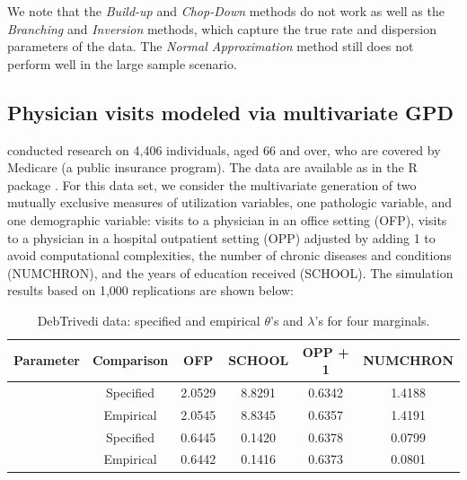 We note that the \textit{Build-up} and \textit{Chop-Down} methods do not work as well as the \textit{Branching} and \textit{Inversion} methods, which capture the true rate and dispersion parameters of the data. The \textit{Normal Approximation} method still does not perform well in the large sample scenario.

\subsection{Physician visits modeled via multivariate GPD}

\cite{deb1997demand} conducted research on 4,406 individuals, aged 66 and over, who are covered by Medicare (a public insurance program). The data are available as  in the R package  \citep{MixAll2019}. For this data set, we consider the multivariate generation of two mutually exclusive measures of utilization variables, one pathologic variable, and one demographic variable: visits to a physician in an office setting (OFP), visits to a physician in a hospital outpatient setting (OPP) adjusted by adding 1 to avoid computational complexities, the number of chronic diseases and conditions (NUMCHRON), and the years of education received (SCHOOL). The simulation results based on 1,000 replications are shown below:

\begin{table}[ht]
\caption{DebTrivedi data: specified and empirical $\theta$'s and $\lambda$'s for four marginals.}
\centering 
\begin{tabularx}{0.63\paperwidth}{lccccc} 
\toprule
Parameter & Comparison & OFP & SCHOOL & OPP + 1 & NUMCHRON \\ [0.5ex] 
\midrule
& Specified & 2.0529 & 8.8291 & 0.6342 & 1.4188 \\ [-1ex]
\raisebox{1.5ex}{Rate ($\theta$)} 
& Empirical & 2.0545 & 8.8345 & 0.6357 & 1.4191 \\
\midrule
& Specified & 0.6445 & 0.1420 & 0.6378 & 0.0799 \\ [-1ex]
\raisebox{1.5ex}{Dispersion ($\lambda$)} 
& Empirical & 0.6442 & 0.1416 & 0.6373 & 0.0801 \\
\bottomrule
\end{tabularx}
\label{t-7}
\end{table}

